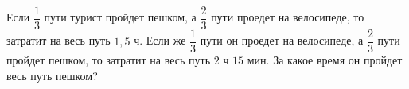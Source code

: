 \begin{ex}
	\begin{condition}
		Если \( \dfrac{1}{3} \) пути турист пройдет пешком, а \( \dfrac{2}{3} \) пути проедет на велосипеде, то затратит на весь путь \( 1,5 \) ч. Если же \( \dfrac{1}{3} \) пути он проедет на велосипеде, а \( \dfrac{2}{3} \) пути пройдет пешком, то затратит на весь путь \( 2 \) ч \( 15 \) мин. За какое время он пройдет весь путь пешком?
	\end{condition}
\end{ex}